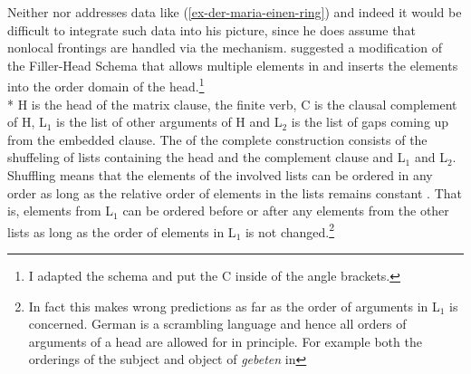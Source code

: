 \begin{exe}
\begin{xlist}
Neither \citet{Wetta2011a} nor  addresses data like (\ref{ex-der-maria-einen-ring}) and indeed it would be difficult to integrate such data into
his picture, since he does assume that nonlocal frontings are handled via the \slasch
mechanism. \citet{Wetta2018a} suggested a modification of the Filler-Head Schema that allows
multiple elements in \slasch and inserts the \slasch elements into the order domain of the
head.\footnote{%
  I adapted the schema and put the C inside of the angle brackets.
}
\ea
\label{schema-f-g-wetta}
 \impl\\*
\z
H is the head of the matrix clause, the finite verb, C is the clausal complement of H, L$_1$ is the
list of other arguments of H and L$_2$ is the list of gaps coming up from the embedded clause. The
\dtrsl of the complete construction consists of the shuffeling of lists containing the head and the
complement clause and L$_1$ and L$_2$. Shuffling means that the elements of the involved lists can be
ordered in any order as long as the relative order of elements in the lists remains constant \citep{Reape94a}. That
is, elements from L$_1$ can be ordered before or after any elements from the other lists as long as
the order of elements in L$_1$ is not changed.\footnote{%
  In fact this makes wrong predictions as far as the order of arguments in L$_1$ is
  concerned. German is a scrambling language and hence all orders of arguments of a head are allowed
  for in principle. For example both the orderings of the subject and object of \emph{gebeten} in
}
\end{xlist}
\end{exe}
